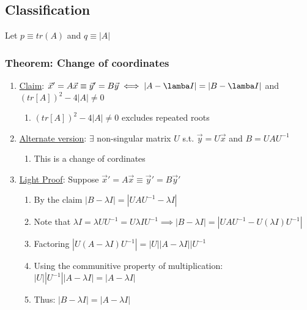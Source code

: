 \documentclass[11pt]{article}
\begin{document}
\subsection{Classification}
\label{sec-10-3}

   Let $p\equiv tr(A)$ and $q\equiv |A|$
\subsubsection{Theorem: Change of coordinates}
\label{sec-10-3-1}

\begin{enumerate}
\item \underline{Claim}: $\vec{x}' = A\vec{x} \equiv \vec{y}' = B\vec{y}
       \iff |A-\lamba I| = |B-\lamba I|$ and $(tr[A])^2 -4|A|
       \neq 0$
\begin{enumerate}
\item $(tr[A])^2 -4|A| \neq 0$ excludes repeated roots
\end{enumerate}
\item \underline{Alternate version}: $\exists$ non-singular matrix $U$ s.t. $\vec{y}=U\vec{x}$ and $B = UAU^{-1}$
\begin{enumerate}
\item This is a change of cordinates
\end{enumerate}
\item \underline{Light Proof}: Suppose $\vec{x}' = A\vec{x} \equiv \vec{y}' = B\vec{y}'$
\begin{enumerate}
\item By the claim $|B-\lambda I| = |UAU^{-1} - \lambda I|$
\item Note that $\lambda I = \lambda U U^{-1} = U\lambda I U^{-1} \implies |B -
          \lambda I| = |UAU^{-1} - U(\lambda I)U^{-1} |$
\item Factoring $|U(A-\lambda I)U^{-1}| = |U| |A-\lambda I||U^{-1}$
\item Using the communitive property of
          multiplication: $|U||U^{-1}||A-\lambda I| = |A-\lambda I|$
\item Thus: $|B - \lambda I| = |A - \lambda I|$
\end{enumerate}
\end{enumerate}
\end{document}
